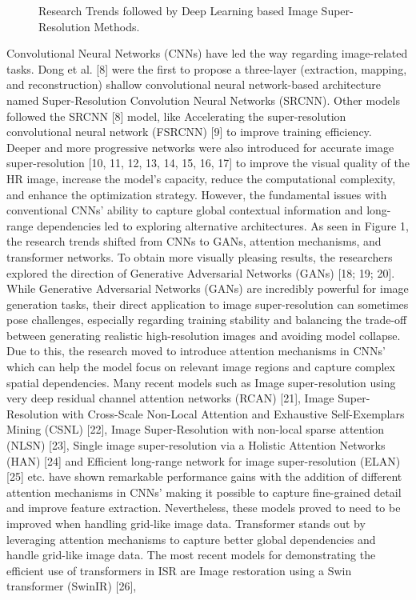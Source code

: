 \documentclass[twocolumn]{svjour3}          %
\begin{document}
\begin{figure}
  \centering
   \caption {Research Trends followed by Deep Learning based Image Super-Resolution Methods.}
    \label{fig:1}
\end{figure}
 
Convolutional Neural Networks (CNNs) have led the way regarding image-related tasks. Dong et al. [8] were the first to propose a three-layer (extraction, mapping, and reconstruction) shallow convolutional neural network-based architecture named Super-Resolution Convolution Neural Networks (SRCNN). Other models followed the SRCNN [8] model, like Accelerating the super-resolution convolutional neural network (FSRCNN) [9] to improve training efficiency. Deeper and more progressive networks were also introduced for accurate image super-resolution [10, 11, 12, 13, 14, 15, 16, 17] to improve the visual quality of the HR image, increase the model's capacity,  reduce the computational complexity, and enhance the optimization strategy. However, the fundamental issues with conventional CNNs' ability to capture global contextual information and long-range dependencies led to exploring alternative architectures. As seen in Figure 1, the research trends shifted from CNNs to GANs, attention mechanisms, and transformer networks. To obtain more visually pleasing results, the researchers explored the direction of Generative Adversarial Networks (GANs) [18; 19; 20]. While Generative Adversarial Networks (GANs) are incredibly powerful for image generation tasks, their direct application to image super-resolution can sometimes pose challenges, especially regarding training stability and balancing the trade-off between generating realistic high-resolution images and avoiding model collapse. Due to this, the research moved to introduce attention mechanisms in CNNs' which can help the model focus on relevant image regions and capture complex spatial dependencies. Many recent models such as Image super-resolution using very deep residual channel attention networks (RCAN) [21], Image Super-Resolution with Cross-Scale Non-Local Attention and Exhaustive Self-Exemplars Mining (CSNL) [22], Image Super-Resolution with non-local sparse attention (NLSN) [23], Single image super-resolution via a Holistic Attention Networks (HAN) [24] and Efficient long-range network for image super-resolution (ELAN) [25] etc. have shown remarkable performance gains with the addition of different attention mechanisms in CNNs' making it possible to capture fine-grained detail and improve feature extraction. Nevertheless, these models proved to need to be improved when handling grid-like image data. Transformer stands out by leveraging attention mechanisms to capture better global dependencies and handle grid-like image data. The most recent models for demonstrating the efficient use of transformers in ISR are Image restoration using a Swin transformer (SwinIR) [26], 
\end{document}
